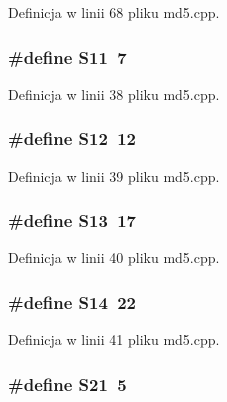 Definicja w linii 68 pliku md5.cpp.\hypertarget{a00009_51398c0e5541164ad4d6615880073305}{
\subsubsection[{S11}]{\setlength{\rightskip}{0pt plus 5cm}\#define S11~7}}
\label{a00009_51398c0e5541164ad4d6615880073305}




Definicja w linii 38 pliku md5.cpp.\hypertarget{a00009_1ec499cd0e54ecc28c2ac2afea5b038e}{
\subsubsection[{S12}]{\setlength{\rightskip}{0pt plus 5cm}\#define S12~12}}
\label{a00009_1ec499cd0e54ecc28c2ac2afea5b038e}




Definicja w linii 39 pliku md5.cpp.\hypertarget{a00009_aeec90429105fb54d853dd4fc7027a54}{
\subsubsection[{S13}]{\setlength{\rightskip}{0pt plus 5cm}\#define S13~17}}
\label{a00009_aeec90429105fb54d853dd4fc7027a54}




Definicja w linii 40 pliku md5.cpp.\hypertarget{a00009_78342b0ccde2ed12fdf19a113cc266cf}{
\subsubsection[{S14}]{\setlength{\rightskip}{0pt plus 5cm}\#define S14~22}}
\label{a00009_78342b0ccde2ed12fdf19a113cc266cf}




Definicja w linii 41 pliku md5.cpp.\hypertarget{a00009_b6d5354f647a0e7592a1f051fc8377b2}{
\subsubsection[{S21}]{\setlength{\rightskip}{0pt plus 5cm}\#define S21~5}}
\label{a00009_b6d5354f647a0e7592a1f051fc8377b2}





